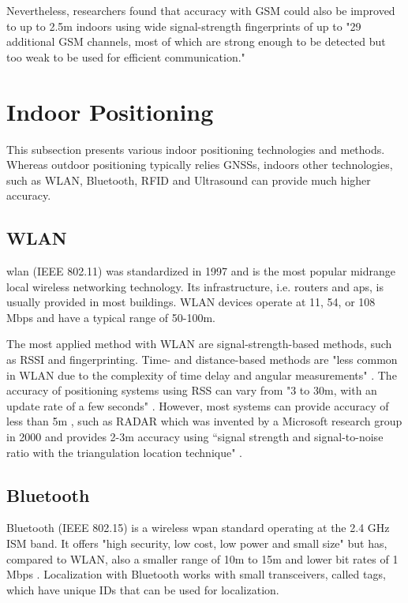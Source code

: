 Nevertheless, researchers found that accuracy with GSM could also be improved to up to 2.5m indoors using wide signal-strength fingerprints of up to "29 additional GSM channels, most of which are strong enough to be detected but too weak to be used for efficient communication." \cite{surveyWirelessIPS}


\section{Indoor Positioning}
This subsection presents various indoor positioning technologies and methods.
Whereas outdoor positioning typically relies GNSSs, indoors other technologies, such as WLAN, Bluetooth, RFID and Ultrasound can provide much higher accuracy.

\subsection*{WLAN}
\ac{wlan} (IEEE 802.11) was standardized in 1997 and is the most popular midrange local wireless networking technology. Its infrastructure, i.e.  routers and \ac{ap}s, is usually provided in most buildings.
WLAN devices operate at 11, 54, or 108 Mbps and have a typical range of 50-100m.

The most applied method with WLAN are signal-strength-based methods, such as RSSI and fingerprinting. Time- and distance-based methods are "less common in WLAN due to the complexity of time delay and angular measurements" \cite{wirelessILSystemsAndTechniques}.
The accuracy of positioning systems using RSS can vary from "3 to 30m, with an update rate of a few seconds" \cite{surveyWirelessIPS}. However, most systems can provide accuracy of less than 5m \cite{seamlessIOsolutions}, such as RADAR which was invented by a Microsoft research group in 2000 and provides 2-3m accuracy using \textquotedblleft signal strength and signal-to-noise ratio with
the triangulation location technique" \cite{surveyIPS}.

\subsection*{Bluetooth}
Bluetooth (IEEE 802.15) is a wireless \ac{wpan} standard operating at the 2.4 GHz ISM band. It offers "high security, low cost, low power and small size" \cite{recentAdvances} but has, compared to WLAN, also a smaller range of 10m to 15m and lower bit rates of 1 Mbps \cite{surveyWirelessIPS}.
Localization with Bluetooth works with small transceivers, called tags, which have unique IDs that can be used for localization.

